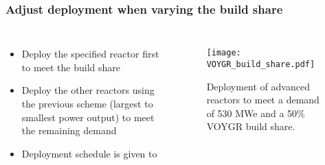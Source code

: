 \begin{frame}
    \frametitle{Adjust deployment when varying the build share}
    \begin{columns}
        \column{4.5cm}
            \begin{itemize}
                \item Deploy the specified reactor first to meet the build share
                \item Deploy the other reactors using the previous scheme (largest 
                      to smallest power output) to meet the remaining demand
                \item Deployment schedule is given to \Cyclus
            \end{itemize}

        \column{6cm}
            \begin{figure}
                \centering 
                \texttt{[image: VOYGR\_build\_share.pdf]}
                \caption{Deployment of advanced reactors to meet 
                a demand of 530 MWe and a 50\% VOYGR build share.}
                \label{fig:build_share_deployment}
            \end{figure}
    \end{columns}
\end{frame}